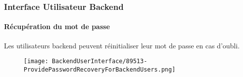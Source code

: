 
\begin{frame}[fragile]
	\frametitle{Interface Utilisateur Backend}
	\framesubtitle{Récupération du mot de passe}

	Les utilisateurs backend peuvent réinitialiser leur mot de passe en cas d'oubli.

	\begin{figure}
		\texttt{[image: BackendUserInterface/89513-ProvidePasswordRecoveryForBackendUsers.png]}
	\end{figure}

\end{frame}

